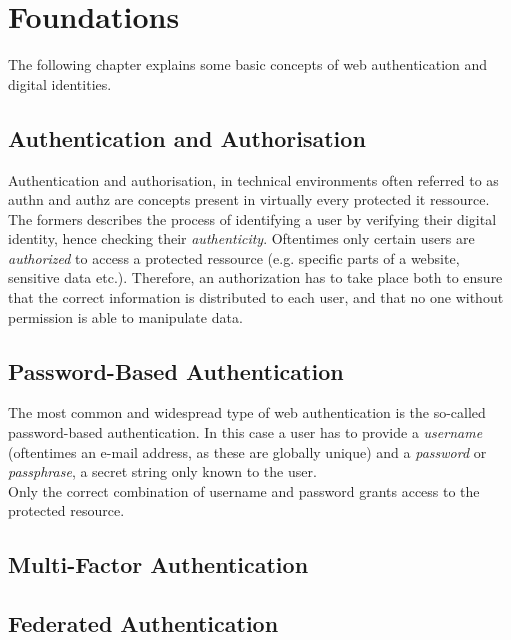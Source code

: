 
\section{Foundations}
\label{sec:foundations}

The following chapter explains some basic concepts of web authentication and digital identities.

\subsection{Authentication and Authorisation}
\label{subsec:authn_authz}

Authentication and authorisation, in technical environments often referred to as \ac{authn} and \ac{authz} are concepts present in virtually every protected \ac{it} ressource.\\
The formers describes the process of identifying a user by verifying their digital identity, hence checking their \emph{authenticity}. Oftentimes only certain users are \emph{authorized} to access a protected ressource (e.g. specific parts of a website, sensitive data etc.). Therefore, an authorization has to take place both to ensure that the correct information is distributed to each user, and that no one without permission is able to manipulate data.

\subsection{Password-Based Authentication}
\label{subsec:pw_based_authn}

The most common and widespread type of web authentication is the so-called password-based authentication. In this case a user has to provide a \emph{username} (oftentimes an e-mail address, as these are globally unique) and a \emph{password} or \emph{passphrase}, a secret string only known to the user.\\
Only the correct combination of username and password grants access to the protected resource.

\subsection{Multi-Factor Authentication}
\label{subsec:mfa}



\subsection{Federated Authentication}
\label{subsec:fed_auth}


